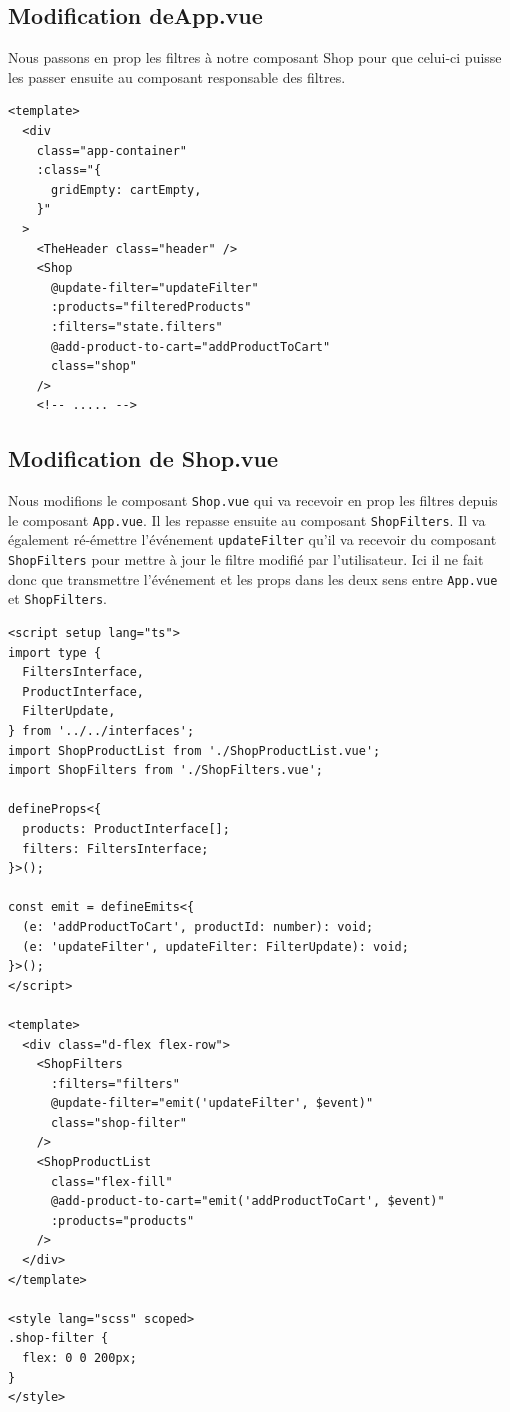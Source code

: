 \subsection{Modification deApp.vue}
Nous passons en {\color{monOrange}prop} les filtres à notre composant {\color{monOrange}Shop} pour que celui-ci puisse les passer ensuite au composant responsable des filtres.
\begin{verbatim}
<template>
  <div
    class="app-container"
    :class="{
      gridEmpty: cartEmpty,
    }"
  >
    <TheHeader class="header" />
    <Shop
      @update-filter="updateFilter"
      :products="filteredProducts"
      :filters="state.filters"
      @add-product-to-cart="addProductToCart"
      class="shop"
    />
    <!-- ..... -->
\end{verbatim}
\subsection{Modification de Shop.vue}
Nous modifions le composant {\tt Shop.vue} qui va recevoir en {\color{monOrange}prop} les filtres depuis le composant {\tt App.vue}. Il les repasse ensuite au composant {\tt ShopFilters}. Il va également ré-émettre l'événement {\tt updateFilter} qu'il va recevoir du composant {\tt ShopFilters} pour mettre à jour le filtre modifié par l'utilisateur. Ici il ne fait donc que transmettre l'événement et les {\color{monOrange}props} dans les deux sens entre {\tt App.vue} et {\tt ShopFilters}.
\begin{verbatim}
<script setup lang="ts">
import type {
  FiltersInterface,
  ProductInterface,
  FilterUpdate,
} from '../../interfaces';
import ShopProductList from './ShopProductList.vue';
import ShopFilters from './ShopFilters.vue';

defineProps<{
  products: ProductInterface[];
  filters: FiltersInterface;
}>();

const emit = defineEmits<{
  (e: 'addProductToCart', productId: number): void;
  (e: 'updateFilter', updateFilter: FilterUpdate): void;
}>();
</script>

<template>
  <div class="d-flex flex-row">
    <ShopFilters
      :filters="filters"
      @update-filter="emit('updateFilter', $event)"
      class="shop-filter"
    />
    <ShopProductList
      class="flex-fill"
      @add-product-to-cart="emit('addProductToCart', $event)"
      :products="products"
    />
  </div>
</template>

<style lang="scss" scoped>
.shop-filter {
  flex: 0 0 200px;
}
</style>
\end{verbatim}

